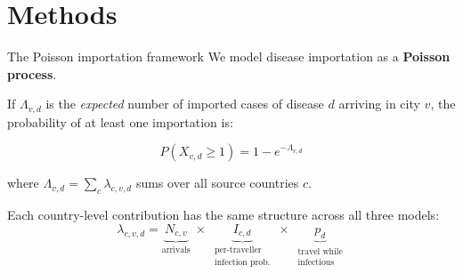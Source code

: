 \documentclass[aspectratio=169, 11pt]{beamer}
\begin{document}
\section{Methods}

\begin{frame}{The Poisson importation framework}
  We model disease importation as a \textbf{Poisson process}.

  \bigskip
  If $\Lambda_{v,d}$ is the \textit{expected} number of imported cases
  of disease $d$ arriving in city $v$, the probability of at least one
  importation is:

  \begin{equation}
    \boxed{P(X_{v,d} \geq 1) = 1 - e^{-\Lambda_{v,d}}}
    \tag{Poisson}
  \end{equation}

  where $\Lambda_{v,d} = \displaystyle\sum_{c} \lambda_{c,v,d}$
  sums over all source countries $c$.

  \bigskip
  Each country-level contribution has the same structure across all
  three models:
  \[
    \lambda_{c,v,d}
    = \underbrace{N_{c,v}}_{\text{arrivals}}
    \;\times\;
    \underbrace{I_{c,d}}_{\substack{\text{per-traveller}\\\text{infection prob.}}}
    \;\times\;
    \underbrace{p_d}_{\substack{\text{travel while}\\\text{infectious}}}
  \]
\end{frame}
\end{document}
